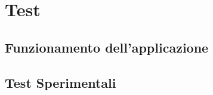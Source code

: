 \def \ti{\textit}
\def \bf{\textbf}

\chapter{Test}
	\label{cap:test}
	
\section{Funzionamento dell'applicazione}
	\label{sec:funzionamento}

\section{Test Sperimentali}
	\label{sec:esperimenti}
